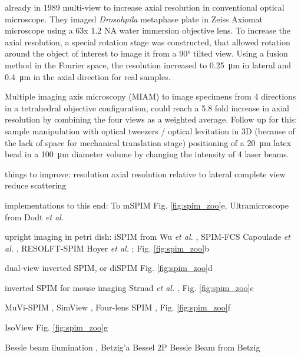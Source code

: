   already in 1989 multi-view to increase axial resolution in conventional optical microscope. They imaged \textit{Drosohpila} metaphase plate in Zeiss Axiomat microscope using a 63x 1.2 NA water immersion objective lens. To increase the axial resolution, a special rotation stage was constructed, that allowed rotation around the object of interest to image it from a 90\si{\degree} tilted view. Using a fusion method in the Fourier space, the resolution increased to \SI{0.25}{\micro\meter} in lateral and \SI{0.4}{\micro\meter} in the axial direction for real samples.

  Multiple imaging axis microscopy (MIAM) \cite{swoger_multiple_2003}
  to image specimens from 4 directions in a tetrahedral objective configuration, could reach a 5.8 fold increase in axial resolution by combining the four views as a weighted average.
  Follow up for this: sample manipulation with optical tweezers / optical levitation in 3D \cite{huisken_three-dimensional_2007}(because of the lack of space for mechanical translation stage)
  positioning of a \SI{20}{\micro m} latex bead in a \SI{100}{\micro m} diameter volume by changing the intensity of 4 laser beams. 

  things to improve: resolution
  axial resolution relative to lateral
  complete view
  reduce scattering
  
  implementations to this end:
  To mSPIM \cite{huisken_even_2007} Fig. \ref{fig:spim_zoo}e, Ultramicroscope from Dodt \textit{et al.} \cite{dodt_ultramicroscopy:_2007}
  
  upright imaging in petri dish: iSPIM from Wu \textit{et al.} \cite{wu_inverted_2011}, SPIM-FCS Capoulade \textit{et al.} \cite{capoulade_quantitative_2011}, RESOLFT-SPIM Hoyer \textit{et al.} \cite{hoyer_breaking_2016}; Fig. \ref{fig:spim_zoo}b

  dual-view inverted SPIM, or diSPIM \cite{kumar_dual-view_2014} Fig. \ref{fig:spim_zoo}d

  inverted SPIM for mouse imaging Strnad \textit{et al.} \cite{strnad_inverted_2016}, Fig. \ref{fig:spim_zoo}c

  MuVi-SPIM \cite{krzic_multiview_2012}, SimView \cite{tomer_quantitative_2012}, Four-lens SPIM \cite{schmid_high-speed_2013}, Fig. \ref{fig:spim_zoo}f

  IsoView \cite{chhetri_whole-animal_2015} Fig. \ref{fig:spim_zoo}g
  
  Bessle beam ilumination \cite{fahrbach_line_2010,fahrbach_propagation_2012,fahrbach_light-sheet_2013}, Betzig'a Bessel \cite{gao_3d_2014} 2P Bessle Beam from Betzig\cite{planchon_rapid_2011}




